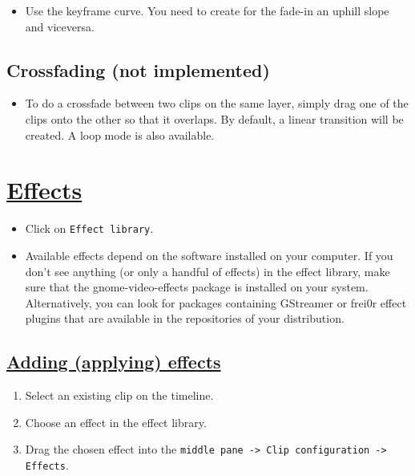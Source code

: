 \begin{itemize}
\item Use the keyframe curve. You need to create for the fade-in an uphill slope and viceversa.
\end{itemize}


\section{Crossfading (not implemented)}

\begin{itemize}
\item To do a crossfade between two clips on the same layer, simply
  drag one of the clips onto the other so that it overlaps. By
  default, a linear transition will be created. A loop mode is also
  available.
\end{itemize}



\chapter{\href{http://www.pitivi.org/manual/effects.html}{Effects}}

\begin{itemize}
\item Click on \verb|Effect library|.
\item Available effects depend on the software installed on your
  computer. If you don't see anything (or only a handful of effects)
  in the effect library, make sure that the gnome-video-effects
  package is installed on your system. Alternatively, you can look for
  packages containing GStreamer or frei0r effect plugins that are
  available in the repositories of your distribution.
\end{itemize}

\section{\href{http://www.pitivi.org/manual/usingeffects.html}{Adding (applying) effects}}

\begin{enumerate}
\item Select an existing clip on the timeline.
\item Choose an effect in the effect library.
\item Drag the chosen effect into the
  \verb|middle pane -> Clip configuration -> Effects|.
\end{enumerate}

